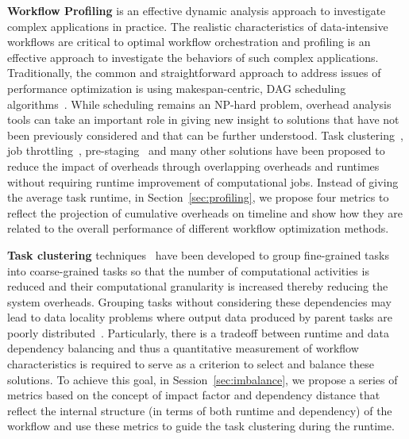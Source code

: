 \textbf{Workflow Profiling} is an effective dynamic analysis approach to investigate complex applications in practice. The realistic characteristics of data-intensive workflows are critical to optimal workflow orchestration and profiling is an effective approach to investigate the behaviors of such complex applications. Traditionally, the common and straightforward approach to address issues of performance optimization is using makespan-centric, DAG scheduling algorithms~\cite{Caniou2011}. While scheduling remains an NP-hard problem, overhead analysis tools can take an important role in giving new insight to solutions that have not been previously considered and that can be further understood. Task clustering~\cite{Chen2012}, job throttling~\cite{Humphrey2008}, pre-staging~\cite{Amer2012} and many other solutions have been proposed to reduce the impact of overheads through overlapping overheads and runtimes without requiring runtime improvement of computational jobs. Instead of giving the average task runtime, in Section~\ref{sec:profiling}, we propose four metrics to reflect the projection of cumulative overheads on timeline and show how they are related to the overall performance of different workflow optimization methods.    


\textbf{Task clustering} techniques~\cite{Ostberg2011, Chen2012, Maheshwari2012, Ferreira-granularity-2013} have been developed to group fine-grained tasks into coarse-grained tasks so that the number of computational activities is reduced and their computational granularity is increased thereby reducing the system overheads. Grouping tasks without considering these dependencies may lead to data locality problems where output data produced by parent tasks are poorly distributed~\cite{Chen-balanced-2013}. Particularly, there is a tradeoff between runtime and data dependency balancing and thus a quantitative measurement of workﬂow characteristics is required to serve as a criterion to select and balance these solutions. To achieve this goal, in Session~\ref{sec:imbalance}, we propose a series of metrics based on the concept of impact factor and dependency distance that reflect the internal structure (in terms of both runtime and dependency) of the workﬂow  and use these metrics to guide the task clustering during the runtime. 

